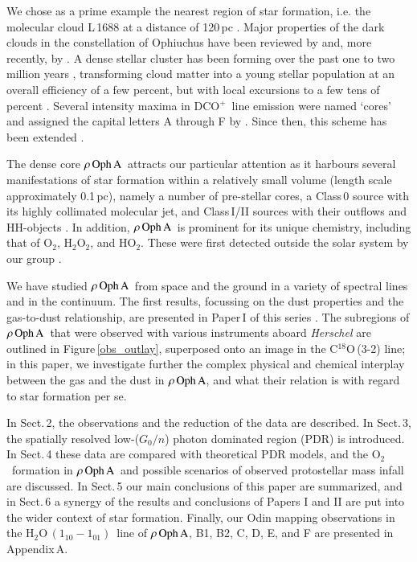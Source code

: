 \documentclass{aa}
\newcommand{\etttio}{{\rm H}$_2$O$\,(1_{10} - 1_{01})$}
\newcommand{\molo}{O$_{2}$}                     %
\newcommand{\dcop}{DCO$^{+}$}
\newcommand{\roa}{$\rho \, {\rm Oph \, A}$}
\begin{document}
We chose as a prime example the nearest region of star formation, i.e. the molecular cloud L\,1688 at a  distance of 120\,pc \citep{loinard2008}. Major properties of the dark clouds in the constellation of Ophiuchus have been reviewed by \citet{wilking2008} and, more recently, by \citet{white2015}.  A dense stellar cluster has been forming over the past one to two million years \citep{bontemps2001,evans2009,ducourant2017}, transforming cloud matter into a young stellar population at an overall efficiency of a few percent, but with local excursions to a few tens of percent \citep{wilkinglada1983,liseau1995,liseau1999,bontemps2001,evans2009}. Several intensity maxima in \dcop\ line emission were named `cores' and assigned the capital letters A through F by \citet{loren1990}. Since then, this scheme has been extended  \citep[e.g.][]{white2015,punanova2016}.

The dense core \roa\ attracts our particular attention as it harbours several manifestations of star formation within a relatively small volume (length scale approximately 0.1\,pc), namely a number of pre-stellar cores, a Class\,0 source with its highly collimated molecular jet, and Class\,I/II sources with their outflows and HH-objects \citep[Fig.\,\ref{obs_outlay} and][]{liseau2015}. In addition, \roa\ is prominent for its unique chemistry, including that of \molo, H$_2$O$_2$, and HO$_2$. These were first detected outside the solar system by our group \citep{larsson2007,liseau2012, bergman2011b,parise2012}.

We have studied \roa\ from space and the ground in a variety of spectral lines and in the continuum. The first results, focussing on the dust properties and the gas-to-dust relationship, are presented in Paper\,I  of this series \citep{liseau2015}. The subregions of \roa\ that were observed with various instruments aboard {\it Herschel} \citep{pilbratt2010} are outlined in Figure\,\ref{obs_outlay}, superposed onto an image in the C$^{18}$O\,(3-2) line;  in this paper, we investigate further the complex physical and chemical interplay between the gas and the dust in \roa, and what their relation is with regard to star formation per se.

In Sect.\,2, the observations and the reduction of the data are described. In Sect.\,3, the spatially resolved low-($G_0/n$) photon dominated region (PDR) is introduced. In Sect.\,4 these data are compared with theoretical PDR models, and the  \molo\ formation in \roa\ and possible scenarios of observed protostellar mass infall are discussed. In Sect.\,5 our main conclusions of this paper are summarized, and in Sect.\,6 a synergy of the results and conclusions of  Papers I and II are put into the wider context of star formation. Finally, our Odin mapping observations in the \etttio\ line of \roa, B1, B2, C, D, E, and F are presented in Appendix\,A.
\end{document}
